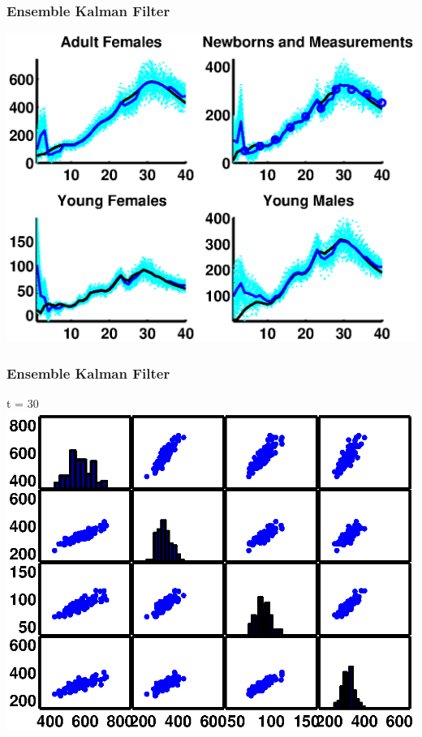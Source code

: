 \documentclass[mathserif]{beamer}
\begin{document}
\begin{frame}
  \begin{center}
    \frametitle{Ensemble Kalman Filter}
    \includegraphics[width=1\textwidth]{filtered}
  \end{center}
\end{frame}

\begin{frame}
  \begin{center}
    \frametitle{Ensemble Kalman Filter}
    t = 30
    \includegraphics[width=1\textwidth]{kf30cov}
  \end{center}
\end{frame}
\end{document}
